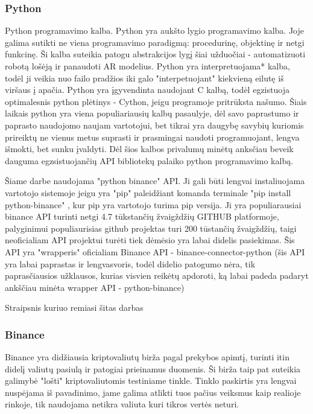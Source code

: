 \documentclass{VUMIFInfKursinis}
\begin{document}
\subsubsection{Python}
Python programavimo kalba. Python yra aukšto lygio programavimo kalba. Joje galima sutikti ne viena programavimo paradigmą:
procedurinę, objektinę ir netgi funkcinę. Ši kalba suteikia patogu abstrakcijos lygį šiai užduočiai - automatizuoti robotą lošėją ir panaudoti AR modelius.
Python yra interpretuojama* kalba, todėl ji veikia nuo failo pradžios iki galo "interpetuojant" kiekvieną eilutę iš viršaus į apačia.
Python yra įgyvendinta naudojant C kalbą, todėl egzistuoja optimalesnis python plėtinys - Cython, jeigu programoje pritrūksta našumo. Šiais laikais
python yra viena populiariausių kalbų pasaulyje, dėl savo paprastumo ir paprasto naudojomo naujam vartotojui, bet tikrai yra daugybę savybių
kuriomis prireiktų ne vienus metus suprasti ir prasmingai naudoti programuojant, lengva išmokti, bet sunku įvaldyti. Dėl šios kalbos privalumų minėtų anksčiau
beveik dauguma egzsistuojančių API bibliotekų palaiko python programavimo kalbą.

Šiame darbe naudojama "python binance" API. Ji gali būti lengvai instaliuojama vartotojo sistemoje jeigu yra "pip" paleidžiant komanda terminale "pip install python-binance"
, kur pip yra vartotojo turima pip versija. Ji yra populiarausiai binance API turinti netgi 4.7 tūkstančių žvaigždžių GITHUB platformoje\cite{DokTest}, palyginimui populiaurisias github projektas turi
200 tūstančių žvaigždžių, taigi neoficialiam API projektui turėti tiek dėmėsio yra labai didelis pasiekimas. Šis API yra "wrapperis" oficialiam Binance 
API - binance-connector-python (šis API yra labai paprastas ir lengvasvoris, todėl didelio patogumo nėra, tik paprasčiausios užklausos, kurias visvien
reikėtų apdoroti, ką labai padeda padaryt ankščiau minėta wrapper API - python-binance)  

Straipsnis kuriuo remiasi šitas darbas
\subsubsection{Binance}
Binance yra didžiausia kriptovaliutų birža pagal prekybos apimtį, turinti itin didelį valiutų pasiulą ir patogiai prieinamus duomenis. Ši birža taip pat
suteikia galimybė "lošti" kriptovaliutomis testiniame tinkle. Tinklo paskirtis yra lengvai nuspėjama iš pavadinimo, jame galima atlikti tuos pačius 
veiksmus kaip realioje rinkoje, tik naudojama netikra valiuta kuri tikros vertės neturi. 
\end{document}
